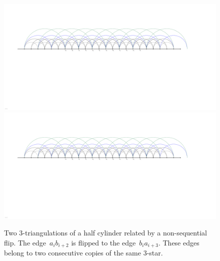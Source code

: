 \documentclass{amsart}
\theoremstyle{remark}
\begin{document}
\begin{figure}
	\capstart
	\includegraphics[page=2, scale=.5, clip, trim=15cm 0cm 17cm 0cm]{FNSk3p2} \\[.5cm]
	\includegraphics[page=3, scale=.5, clip, trim=15cm 0cm 17cm 0cm]{FNSk3p2}
	\caption{Two $3$-triangulations of a half cylinder related by a non-sequential flip. The edge~$a_ib_{i+2}$ is flipped to the edge~$b_ia_{i+3}$. These edges belong to two consecutive copies of the same $3$-star.}
	\label{fig:nonsequential}
\end{figure}
\end{document}
